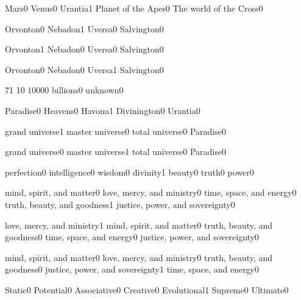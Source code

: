 \quizheader


{Mars}{0}
{Venus}{0}
{Urantia}{1}
{Planet of the Apes}{0}
{The world of the Cross}{0}
\qstop

{Orvonton}{0}
{Nebadon}{1}
{Uversa}{0}
{Salvington}{0}
\qstop

{Orvonton}{1}
{Nebadon}{0}
{Uversa}{0}
{Salvington}{0}
\qstop

{Orvonton}{0}
{Nebadon}{0}
{Uversa}{1}
{Salvington}{0}
\qstop

{7}{1}
{1}{0}
{1000}{0}
{billions}{0}
{unknown}{0}
\qstop

{Paradise}{0}
{Heavens}{0}
{Havona}{1}
{Divinington}{0}
{Urantia}{0}
\qstop

{grand universe}{1}
{master universe}{0}
{total universe}{0}
{Paradise}{0}
\qstop

{grand universe}{0}
{master universe}{1}
{total universe}{0}
{Paradise}{0}
\qstop

{perfection}{0}
{intelligence}{0}
{wisdom}{0}
{divinity}{1}
{beauty}{0}
{truth}{0}
{power}{0}
\qstop

{mind, spirit, and matter}{0}
{love, mercy, and ministry}{0}
{time, space, and energy}{0}
{truth, beauty, and goodness}{1}
{justice, power, and sovereignty}{0}
\qstop

{love, mercy, and ministry}{1}
{mind, spirit, and matter}{0}
{truth, beauty, and goodness}{0}
{time, space, and energy}{0}
{justice, power, and sovereignty}{0}
\qstop

{mind, spirit, and matter}{0}
{love, mercy, and ministry}{0}
{truth, beauty, and goodness}{0}
{justice, power, and sovereignty}{1}
{time, space, and energy}{0}
\qstop

{Static}{0}
{Potential}{0}
{Associative}{0}
{Creative}{0}
{Evolutional}{1}
{Supreme}{0}
{Ultimate}{0}
\qstop


